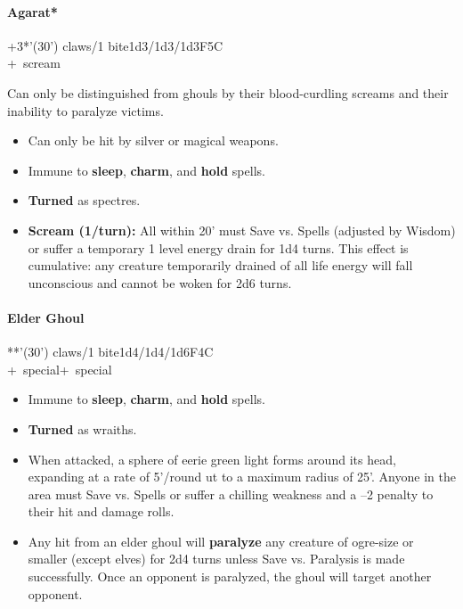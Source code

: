 \documentclass[english,11pt,openany,letterpaper,twocolumn]{book}
\begin{document}
\hypertarget{agarat}{}
\paragraph{Agarat*}
+3*'(30') claws/1 bite\tab 1d3/1d3/1d3\tab F5\tab C
\\+~scream

Can only be distinguished from ghouls by their blood-curdling screams and their inability to paralyze victims.
\begin{itemize}[leftmargin=*,label=\itshape\textbullet]
\item
Can only be hit by silver or magical weapons.
\item
Immune to \textbf{sleep}, \textbf{charm}, and \textbf{hold} spells.
\item
\textbf{Turned} as spectres.
\item
\textbf{Scream (1/turn):} All within 20' must Save vs. Spells (adjusted by Wisdom) or suffer a temporary 1 level energy drain for 1d4 turns. This effect is cumulative: any creature temporarily drained of all life energy will fall unconscious and cannot be woken for 2d6 turns.
\end{itemize}


\skipline
\hypertarget{elder-ghoul}{}
\paragraph{Elder Ghoul}
**'(30') claws/1 bite\tab 1d4/1d4/1d6\tab F4\tab C
\\+~special\tab +~special

\begin{itemize}[leftmargin=*,label=\itshape\textbullet]
\item
Immune to \textbf{sleep}, \textbf{charm}, and \textbf{hold} spells.
\item
\textbf{Turned} as wraiths.
\item
When attacked, a sphere of eerie green light forms around its head, expanding at a rate of 5'/round ut to a maximum radius of 25'. Anyone in the area must Save vs. Spells or suffer a chilling weakness and a --2 penalty to their hit and damage rolls.
\item
Any hit from an elder ghoul will \textbf{paralyze} any creature of ogre-size or smaller (except elves) for 2d4 turns unless Save vs. Paralysis is made successfully. Once an opponent is paralyzed, the ghoul will target another opponent.
\end{itemize}
\end{document}
